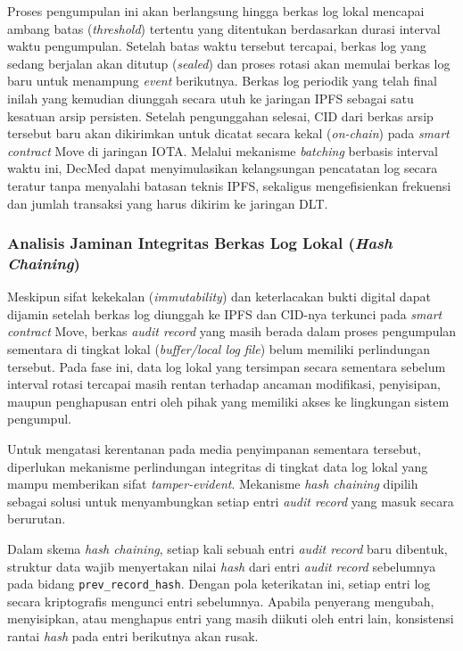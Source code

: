 Proses pengumpulan ini akan berlangsung hingga berkas log lokal mencapai ambang batas (\textit{threshold}) tertentu yang ditentukan berdasarkan durasi interval waktu pengumpulan. Setelah batas waktu tersebut tercapai, berkas log yang sedang berjalan akan ditutup (\textit{sealed}) dan proses rotasi akan memulai berkas log baru untuk menampung \textit{event} berikutnya. Berkas log periodik yang telah final inilah yang kemudian diunggah secara utuh ke jaringan IPFS sebagai satu kesatuan arsip persisten. Setelah pengunggahan selesai, CID dari berkas arsip tersebut baru akan dikirimkan untuk dicatat secara kekal (\textit{on-chain}) pada \textit{smart contract} Move di jaringan IOTA. Melalui mekanisme \textit{batching} berbasis interval waktu ini, DecMed dapat menyimulasikan kelangsungan pencatatan log secara teratur tanpa menyalahi batasan teknis IPFS, sekaligus mengefisienkan frekuensi dan jumlah transaksi yang harus dikirim ke jaringan DLT.

\subsubsection{Analisis Jaminan Integritas Berkas Log Lokal (\textit{Hash Chaining})}
\label{subsubsec:analisis-hash-chaining}

Meskipun sifat kekekalan (\textit{immutability}) dan keterlacakan bukti digital dapat dijamin setelah berkas log diunggah ke IPFS dan CID-nya terkunci pada \textit{smart contract} Move, berkas \textit{audit record} yang masih berada dalam proses pengumpulan sementara di tingkat lokal (\textit{buffer/local log file}) belum memiliki perlindungan tersebut. Pada fase ini, data log lokal yang tersimpan secara sementara sebelum interval rotasi tercapai masih rentan terhadap ancaman modifikasi, penyisipan, maupun penghapusan entri oleh pihak yang memiliki akses ke lingkungan sistem pengumpul.

Untuk mengatasi kerentanan pada media penyimpanan sementara tersebut, diperlukan mekanisme perlindungan integritas di tingkat data log lokal yang mampu memberikan sifat \textit{tamper-evident}. Mekanisme \textit{hash chaining} dipilih sebagai solusi untuk menyambungkan setiap entri \textit{audit record} yang masuk secara berurutan.

Dalam skema \textit{hash chaining}, setiap kali sebuah entri \textit{audit
record} baru dibentuk, struktur data wajib menyertakan nilai \textit{hash} dari
entri \textit{audit record} sebelumnya pada bidang \texttt{prev\_record\_hash}.
Dengan pola keterikatan ini, setiap entri log secara kriptografis mengunci entri
sebelumnya. Apabila penyerang mengubah, menyisipkan, atau menghapus entri yang
masih diikuti oleh entri lain, konsistensi rantai \textit{hash} pada entri
berikutnya akan rusak.
 
